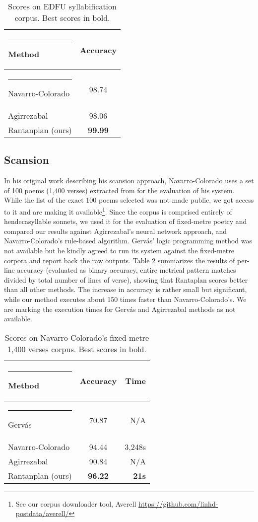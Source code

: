 \documentclass[a4paper,11pt,twocolumn,twoside]{article}
\begin{document}
\begin{table} [htbp]
\begin{center}
\begin{tabular} {|l|c|}
  \hline\rule{-2pt}{15pt}
  {\bf Method} & {\bf Accuracy}\\
  \hline\rule{-4pt}{10pt}
  Navarro-Colorado & 98.74 \\
  Agirrezabal & 98.06 \\
  Rantanplan (ours) & \textbf{99.99} \\
\hline
\end{tabular}
\end{center}
\caption{\label{table.1}Scores on EDFU syllabification corpus. Best scores in bold.}
\end{table}

\subsection{Scansion}
In his original work describing his scansion approach, Navarro-Colorado uses a set of 100 poems (1,400 verses) extracted from \cite{navarro2016metrical} for the evaluation of his system. While the list of the exact 100 poems selected was not made public, we got access to it and are making it available\footnote{See our corpus downloader tool, Averell \url{https://github.com/linhd-postdata/averell/}}. Since the corpus is comprised entirely of hendecasyllable sonnets, we used it for the evaluation of fixed-metre poetry and compared our results against Agirrezabal's neural network approach, and Navarro-Colorado's rule-based algorithm. Gervás' logic programming method was not available but he kindly agreed to run its system against the fixed-metre corpora and report back the raw outputs. Table \ref{table.2} summarizes the results of per-line accuracy (evaluated as binary accuracy, entire metrical pattern matches divided by total number of lines of verse), showing that Rantaplan scores better than all other methods. The increase in accuracy is rather small but significant, while our method executes about 150 times faster than Navarro-Colorado's. We are marking the execution times for Gervás and Agirrezabal methods as not available.

\begin{table} [htbp]
\begin{center}
\begin{tabular} {|l|c|r|}
  \hline\rule{-2pt}{15pt}
  {\bf Method} & {\bf Accuracy} & {\bf Time}\\
  \hline\rule{-4pt}{10pt}
Gervás & 70.87 & N/A \\
Navarro-Colorado & 94.44 & 3,248s \\
Agirrezabal & 90.84 & N/A\\
Rantanplan (ours) & \textbf{96.22} & \textbf{21s} \\
\hline
\end{tabular}
\end{center}
\caption{\label{table.2}Scores on Navarro-Colorado's fixed-metre 1,400 verses corpus. Best scores in bold.}
\end{table}
\end{document}
